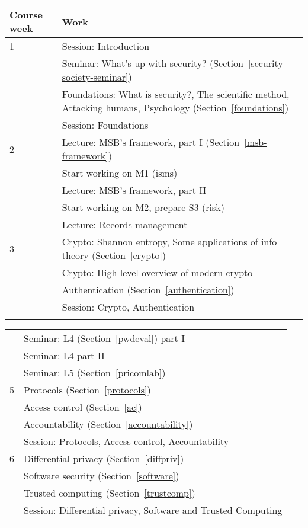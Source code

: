 	\centering
  \begin{tabular}{lp{9cm}}
    \toprule
    \textbf{Course week}	& \textbf{Work} \\
    \midrule
    1
      & Session: Introduction\\
      & Seminar: What's up with security? (Section~\ref{security-society-seminar})\\
      & Foundations: What is security?, The scientific method, Attacking 
      humans, Psychology (Section~\ref{foundations})\\
      & Session: Foundations\\
    \midrule
    2
      & Lecture: MSB's framework, part I (Section~\ref{msb-framework})\\
      & Start working on M1 (isms)\\
      & Lecture: MSB's framework, part II\\
      & Start working on M2, prepare S3 (risk)\\
      & Lecture: Records management\\
    \midrule
    3
      & Crypto: Shannon entropy, Some applications of info theory 
      (Section~\ref{crypto})\\
      & Crypto: High-level overview of modern crypto\\
      & Authentication (Section~\ref{authentication})\\
      & Session: Crypto, Authentication\\
    \midrule
\mode<presentation>{%
  \end{tabular}
  \begin{tabular}{lp{9cm}}
}%
    4
      & Seminar: L4 (Section~\ref{pwdeval}) part I\\
      & Seminar: L4 part II\\
      & Seminar: L5 (Section~\ref{pricomlab})\\
    \midrule
    5
      & Protocols (Section~\ref{protocols})\\
      & Access control (Section~\ref{ac})\\
      & Accountability (Section~\ref{accountability})\\
      & Session: Protocols, Access control, Accountability\\
    \midrule
    6
      & Differential privacy (Section~\ref{diffpriv})\\
      & Software security (Section~\ref{software})\\
      & Trusted computing (Section~\ref{trustcomp})\\
      & Session: Differential privacy, Software and Trusted Computing\\
    \midrule
\mode<presentation>{%
  \end{tabular}
